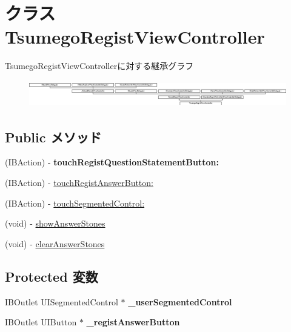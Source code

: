 \hypertarget{interface_tsumego_regist_view_controller}{
\section{クラス TsumegoRegistViewController}
\label{interface_tsumego_regist_view_controller}
}
TsumegoRegistViewControllerに対する継承グラフ\begin{figure}[H]
\begin{center}
\leavevmode
\includegraphics[height=1.185185cm]{interface_tsumego_regist_view_controller}
\end{center}
\end{figure}
\subsection*{Public メソッド}
\begin{DoxyCompactItemize}
\item 
\hypertarget{interface_tsumego_regist_view_controller_a0fb30c57c5fc322ce12324e540e34b05}{
(IBAction) -\/ {\bfseries touchRegistQuestionStatementButton:}}
\label{interface_tsumego_regist_view_controller_a0fb30c57c5fc322ce12324e540e34b05}

\item 
(IBAction) -\/ \hyperlink{interface_tsumego_regist_view_controller_a7ce4b83cc166f8846ab8412a4072c0b8}{touchRegistAnswerButton:}
\item 
(IBAction) -\/ \hyperlink{interface_tsumego_regist_view_controller_ae034e153b1fc89b8bdbca5a3a1b962dc}{touchSegmentedControl:}
\item 
(void) -\/ \hyperlink{interface_tsumego_regist_view_controller_ad89444447bd6f8b4b5432c1312433c99}{showAnswerStones}
\item 
(void) -\/ \hyperlink{interface_tsumego_regist_view_controller_a13002ba7374640f80c252671dc8fb1e9}{clearAnswerStones}
\end{DoxyCompactItemize}
\subsection*{Protected 変数}
\begin{DoxyCompactItemize}
\item 
\hypertarget{interface_tsumego_regist_view_controller_a8818ed1e51e7a58634428b12c629903f}{
IBOutlet UISegmentedControl $\ast$ {\bfseries \_\-userSegmentedControl}}
\label{interface_tsumego_regist_view_controller_a8818ed1e51e7a58634428b12c629903f}

\item 
\hypertarget{interface_tsumego_regist_view_controller_a7f5838a4ea792f976fdf51e1de95b0ba}{
IBOutlet UIButton $\ast$ {\bfseries \_\-registAnswerButton}}
\label{interface_tsumego_regist_view_controller_a7f5838a4ea792f976fdf51e1de95b0ba}

\end{DoxyCompactItemize}
